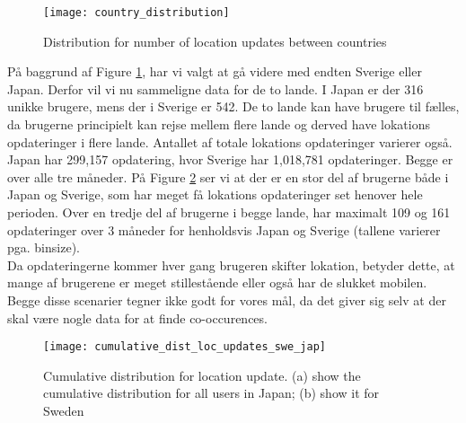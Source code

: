 

\begin{figure}[H]
    \centering
    \texttt{[image: country\_distribution]}
    \caption{Distribution for number of location updates between countries}
    \label{fig:country_dist}
\end{figure}

På baggrund af Figure \ref{fig:country_dist}, har vi valgt at gå videre med endten Sverige eller Japan. Derfor vil vi nu sammeligne data for de to lande. 
I Japan er der 316 unikke brugere, mens der i Sverige er 542. De to lande kan have brugere til fælles, da brugerne principielt kan rejse mellem flere lande og derved have lokations opdateringer i flere lande.  
Antallet af totale lokations opdateringer varierer også. Japan har 299,157 opdatering, hvor Sverige har 1,018,781 opdateringer. Begge er over alle tre måneder. 
På Figure \ref{fig:country_cd} ser vi at der er en stor del af brugerne både i Japan og Sverige, som har meget få lokations opdateringer set henover hele perioden. Over en tredje del af brugerne i begge lande, har maximalt 109 og 161 opdateringer over 3 måneder for henholdsvis Japan og Sverige (tallene varierer pga. binsize).\\
Da opdateringerne kommer hver gang brugeren skifter lokation, betyder dette, at mange af brugerene er meget stillestående eller også har de slukket mobilen. Begge disse scenarier tegner ikke godt for vores mål, da det giver sig selv at der skal være nogle data for at finde co-occurences. 


\begin{figure}[H]
    \centering
    \texttt{[image: cumulative\_dist\_loc\_updates\_swe\_jap]}
    \caption[Cumulative distribution for location update]{Cumulative distribution for location update. (a) show the cumulative distribution for all users in Japan; (b) show it for Sweden}
    \label{fig:country_cd}
\end{figure}



